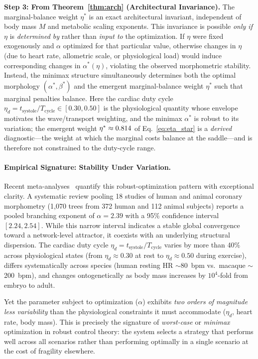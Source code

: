 \textbf{Step 3: From Theorem~\ref{thm:arch} (Architectural Invariance).} The
marginal-balance weight $\eta^*$ is an exact architectural invariant,
independent of body mass $M$ and metabolic scaling exponents. This invariance is
possible \emph{only if} $\eta$ is \emph{determined by} rather than \emph{input
to} the optimization. If $\eta$ were fixed exogenously and $\alpha$ optimized
for that particular value, otherwise changes in $\eta$ (due to heart rate,
allometric scale, or physiological load) would induce corresponding changes in
$\alpha^*(\eta)$, violating the observed morphometric stability. Instead, the
minimax structure simultaneously determines both the optimal morphology
$(\alpha^*, \beta^*)$ and the emergent marginal-balance weight $\eta^*$
such that marginal penalties balance. Here the cardiac duty cycle $\eta_d =
t_\mathrm{systole}/T_\mathrm{cycle} \in [0.30, 0.50]$ is the physiological
quantity whose envelope motivates the wave/transport weighting, and the minimax
$\alpha^*$ is robust to its variation; the emergent weight $\eta^* \approx
0.814$ of Eq.~\eqref{eq:eta_star} is a \emph{derived} diagnostic---the
weight at which the marginal costs balance at the saddle---and is therefore not
constrained to the duty-cycle range.

\paragraph{Empirical Signature: Stability Under Variation.}

Recent meta-analyses~\cite{taylor2024} quantify this robust-optimization pattern
with exceptional clarity. A systematic review pooling 18 studies of human and
animal coronary morphometry (1,070 trees from 372 human and 112 animal subjects)
reports a pooled branching exponent of $\alpha = 2.39$ with a 95\% confidence
interval $[2.24, 2.54]$. While this narrow interval indicates a stable global
convergence toward a network-level attractor, it coexists with an underlying
structural dispersion. The cardiac duty cycle $\eta_d =
t_\mathrm{systole}/T_\mathrm{cycle}$ varies by more than 40\% across
physiological states (from $\eta_d \approx 0.30$ at rest to
$\eta_d \approx 0.50$ during exercise), differs systematically
across species (human resting HR $\sim$80~bpm vs.~macaque $\sim$200~bpm), and
changes ontogenetically as body mass increases by $10^4$-fold from embryo to
adult.

Yet the parameter subject to optimization ($\alpha$) exhibits \emph{two
orders of magnitude less variability} than the physiological constraints it must
accommodate ($\eta_d$, heart rate, body mass). This is precisely the
signature of \emph{worst-case} or \emph{minimax} optimization in robust control
theory: the system selects a strategy that performs well across all scenarios
rather than performing optimally in a single scenario at the cost of fragility
elsewhere.

